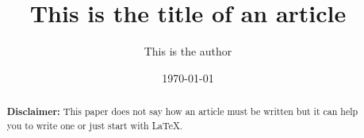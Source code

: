 \documentclass{article}         %
\title{This is the title of an article}
\author{This is the author}
\date{\today}
\begin{document}
\maketitle

\begin{abstract}
    \textbf{Disclaimer: }This paper does not say how an article must be written but it can help you to write one or just start with \LaTeX.
\end{abstract}


\clearpage





\printglossaries{}


\end{document}
